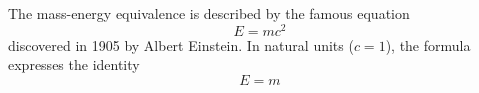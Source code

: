 \documentclass{article}
\begin{document}
    The mass-energy equivalence is described by the famous equation
    \[ E=mc^2 \]
    discovered in 1905 by Albert Einstein. 
    In natural units ($c = 1$), the formula expresses the identity
    \begin{equation}
        E=m
    \end{equation}
\end{document}
